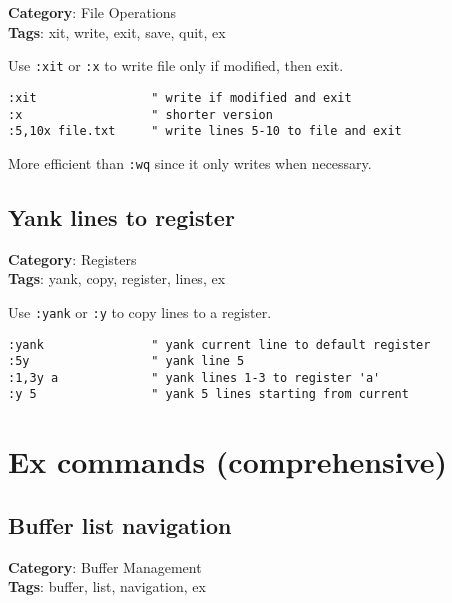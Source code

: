 {{{{{\textbf{Category}: File Operations\\ \textbf{Tags}: xit, write, exit, save, quit, ex
\vspace{0.5cm}

Use {\footnotesize \Verb§:xit§} or {\footnotesize \Verb§:x§} to write file only if modified, then exit.

\begin{Exa*}{}
\begin{Verbatim}[fontsize=\footnotesize, breaklines, breakanywhere]
:xit                " write if modified and exit
:x                  " shorter version
:5,10x file.txt     " write lines 5-10 to file and exit
\end{Verbatim}
\end{Exa*}

More efficient than {\footnotesize \Verb§:wq§} since it only writes when necessary.

\section{Yank lines to register}

\textbf{Category}: Registers\\ \textbf{Tags}: yank, copy, register, lines, ex
\vspace{0.5cm}

Use {\footnotesize \Verb§:yank§} or {\footnotesize \Verb§:y§} to copy lines to a register.

\begin{Exa*}{}
\begin{Verbatim}[fontsize=\footnotesize, breaklines, breakanywhere]
:yank               " yank current line to default register
:5y                 " yank line 5
:1,3y a             " yank lines 1-3 to register 'a'
:y 5                " yank 5 lines starting from current
\end{Verbatim}
\end{Exa*}

\chapter{Ex commands (comprehensive)}
\section{Buffer list navigation}

\textbf{Category}: Buffer Management\\ \textbf{Tags}: buffer, list, navigation, ex
\vspace{0.5cm}

}}}}}
